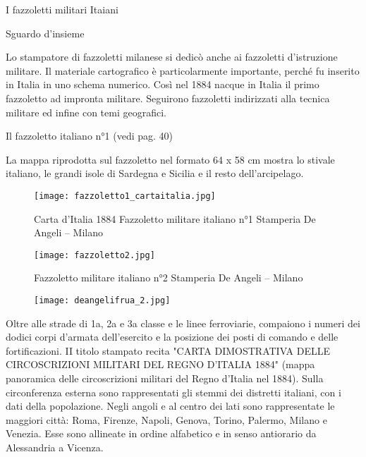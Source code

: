 I fazzoletti militari Itaiani

Sguardo d'insieme
  
 Lo stampatore di fazzoletti milanese si dedicò anche ai fazzoletti d'istruzione militare. Il materiale cartografico è particolarmente importante, perché fu inserito in Italia in uno schema numerico. Così nel 1884 nacque in Italia il primo fazzoletto ad impronta militare. Seguirono fazzoletti indirizzati alla tecnica militare ed infine con temi geografici.

\newpage

Il fazzoletto italiano n°1 (vedi pag. 40)
  
 La mappa riprodotta sul fazzoletto nel formato 64 x 58 cm mostra lo stivale italiano, le grandi isole di Sardegna e Sicilia e il resto dell'arcipelago.
 
\begin{figure}[h]
	\centering
		\texttt{[image: fazzoletto1\_cartaitalia.jpg]}
	\caption{Carta d’Italia 1884 Fazzoletto militare italiano n°1 Stamperia De Angeli – Milano}
	\label{fig:fazzoletto1_cartaitalia}
\end{figure}

\newpage

\begin{figure}[h]
	\centering
		\texttt{[image: fazzoletto2.jpg]}
	\caption{Fazzoletto militare italiano n°2 Stamperia De Angeli – Milano}
	\label{fig:fazzoletto2}
\end{figure}

\newpage

\begin{figure}[h]
	\centering
		\texttt{[image: deangelifrua\_2.jpg]}
	\caption{}
	\label{fig:deangelifrua_2}
\end{figure}

\newpage

Oltre alle strade di 1a, 2a e 3a classe e le linee ferroviarie, compaiono i numeri dei dodici corpi d'armata dell'esercito e la posizione dei posti di comando e delle fortificazioni.
   II titolo stampato recita "CARTA DIMOSTRATIVA DELLE CIRCOSCRIZIONI MILITARI DEL REGNO D'ITALIA 1884" (mappa panoramica delle circoscrizioni militari del Regno d'Italia nel 1884). Sulla circonferenza esterna sono rappresentati gli stemmi dei distretti italiani, con i dati della popolazione. Negli angoli e al centro dei lati sono rappresentate le maggiori città: Roma, Firenze, Napoli, Genova, Torino, Palermo, Milano e Venezia. Esse sono allineate in ordine alfabetico e in senso antiorario da Alessandria a Vicenza.

